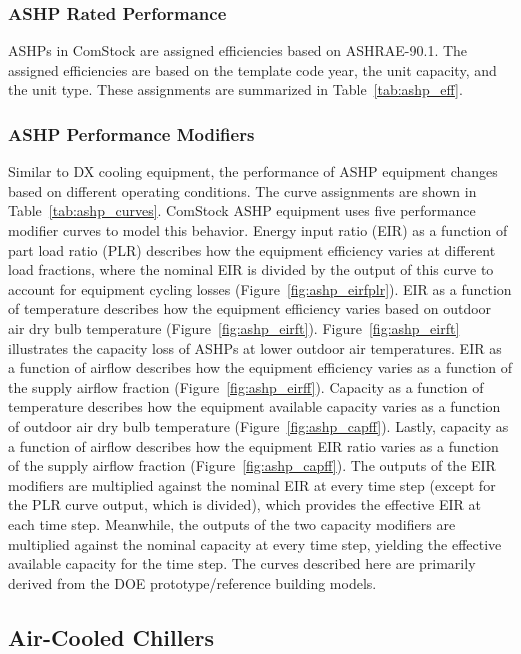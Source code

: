 \subsubsection{ASHP Rated Performance}

ASHPs in ComStock are assigned efficiencies based on ASHRAE-90.1. The assigned efficiencies are based on the template code year, the unit capacity, and the unit type. These assignments are summarized in Table~\ref{tab:ashp_eff}.

\subsubsection{ASHP Performance Modifiers}

Similar to DX cooling equipment, the performance of ASHP equipment changes based on different operating conditions. The curve assignments are shown in Table~\ref{tab:ashp_curves}. ComStock ASHP equipment uses five performance modifier curves to model this behavior. Energy input ratio (EIR) as a function of part load ratio (PLR) describes how the equipment efficiency varies at different load fractions, where the nominal EIR is divided by the output of this curve to account for equipment cycling losses (Figure~\ref{fig:ashp_eirfplr}). EIR as a function of temperature describes how the equipment efficiency varies based on outdoor air dry bulb temperature (Figure~\ref{fig:ashp_eirft}). Figure~\ref{fig:ashp_eirft} illustrates the capacity loss of ASHPs at lower outdoor air temperatures. EIR as a function of airflow describes how the equipment efficiency varies as a function of the supply airflow fraction (Figure~\ref{fig:ashp_eirff}). Capacity as a function of temperature describes how the equipment available capacity varies as a function of outdoor air dry bulb temperature (Figure~\ref{fig:ashp_capff}). Lastly, capacity as a function of airflow describes how the equipment EIR ratio varies as a function of the supply airflow fraction (Figure~\ref{fig:ashp_capff}). The outputs of the EIR modifiers are multiplied against the nominal EIR at every time step (except for the PLR curve output, which is divided), which provides the effective EIR at each time step. Meanwhile, the outputs of the two capacity modifiers are multiplied against the nominal capacity at every time step, yielding the effective available capacity for the time step. The curves described here are primarily derived from the DOE prototype/reference building models.


\subsection{Air-Cooled Chillers}

